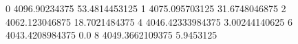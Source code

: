 0 4096.90234375 53.4814453125
1 4075.095703125 31.6748046875
2 4062.123046875 18.7021484375
4 4046.42333984375 3.00244140625
6 4043.4208984375 0.0
8 4049.3662109375 5.9453125

